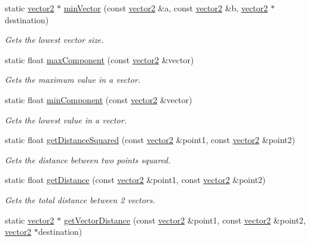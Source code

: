 \begin{DoxyCompactItemize}
static \hyperlink{classflounder_1_1vector2}{vector2} $\ast$ \hyperlink{classflounder_1_1vector2_aa85f88fb72f417b429bf8829c18aee7c}{min\+Vector} (const \hyperlink{classflounder_1_1vector2}{vector2} \&a, const \hyperlink{classflounder_1_1vector2}{vector2} \&b, \hyperlink{classflounder_1_1vector2}{vector2} $\ast$destination)
\begin{DoxyCompactList}\small\item\em Gets the lowest vector size. \end{DoxyCompactList}\item 
static float \hyperlink{classflounder_1_1vector2_a598ef8a41204d55d897ef53da7fb0fb8}{max\+Component} (const \hyperlink{classflounder_1_1vector2}{vector2} \&vector)
\begin{DoxyCompactList}\small\item\em Gets the maximum value in a vector. \end{DoxyCompactList}\item 
static float \hyperlink{classflounder_1_1vector2_ae739e050d87dcfb0ace692b9ca3502db}{min\+Component} (const \hyperlink{classflounder_1_1vector2}{vector2} \&vector)
\begin{DoxyCompactList}\small\item\em Gets the lowest value in a vector. \end{DoxyCompactList}\item 
static float \hyperlink{classflounder_1_1vector2_a985bee9ad411c7b2d21a53dc42c05da4}{get\+Distance\+Squared} (const \hyperlink{classflounder_1_1vector2}{vector2} \&point1, const \hyperlink{classflounder_1_1vector2}{vector2} \&point2)
\begin{DoxyCompactList}\small\item\em Gets the distance between two points squared. \end{DoxyCompactList}\item 
static float \hyperlink{classflounder_1_1vector2_a407291e7304f424864941d71e8b009e6}{get\+Distance} (const \hyperlink{classflounder_1_1vector2}{vector2} \&point1, const \hyperlink{classflounder_1_1vector2}{vector2} \&point2)
\begin{DoxyCompactList}\small\item\em Gets the total distance between 2 vectors. \end{DoxyCompactList}\item 
static \hyperlink{classflounder_1_1vector2}{vector2} $\ast$ \hyperlink{classflounder_1_1vector2_ad1e3c47f5e177a7de2427663f6c66008}{get\+Vector\+Distance} (const \hyperlink{classflounder_1_1vector2}{vector2} \&point1, const \hyperlink{classflounder_1_1vector2}{vector2} \&point2, \hyperlink{classflounder_1_1vector2}{vector2} $\ast$destination)

\end{DoxyCompactItemize}
